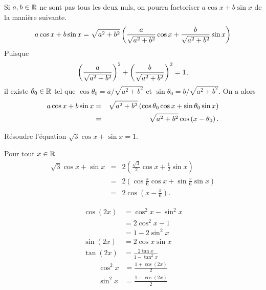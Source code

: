 \documentclass{magnoliaold}
\begin{document}
\begin{remarqueUnique}
\remarque Si $a,b\in\mathbb{R}$ ne sont pas tous les deux nuls, on pourra factoriser
  $a\cos x+b\sin x$ de la manière suivante.
  \[a\cos x+b\sin x=\sqrt{a^2+b^2}\left(\frac{a}{\sqrt{a^2+b^2}}\cos x+
                      \frac{b}{\sqrt{a^2+b^2}}\sin x\right)\]
  Puisque
  \[\left(\frac{a}{\sqrt{a^2+b^2}}\right)^2+\left(\frac{b}{\sqrt{a^2+b^2}}\right)^2=1,\]
  il existe $\theta_0\in\mathbb{R}$ tel que $\cos\theta_0=a/\sqrt{a^2+b^2}$ et
  $\sin\theta_0=b/\sqrt{a^2+b^2}$. On a alors
  \begin{eqnarray*}
  a\cos x+b\sin x &=& \sqrt{a^2+b^2}\left(\cos\theta_0\cos x+\sin\theta_0\sin x\right)\\
                  &=& \sqrt{a^2+b^2}\cos\left(x-\theta_0\right).
  \end{eqnarray*}
\end{remarqueUnique}

\begin{exoUnique}
\exo Résoudre l'équation $\sqrt{3}\cos x+\sin x=1$.
\begin{sol}
Pour tout $x\in\mathbb{R}$
\begin{eqnarray*}
\sqrt{3}\cos x+\sin x
&=& 2\left(\frac{\sqrt{3}}{2}\cos x+\frac{1}{2}\sin x \right)\\
&=& 2\left( \cos \frac{\pi}{6}\cos x+\sin \frac{\pi}{6}\sin x \right)\\
&=& 2\cos\left( x-\frac{\pi}{6}\right).
\end{eqnarray*}
\end{sol}
\end{exoUnique}

\begin{proposition}[utile=-3, nom={Angle double}]
\begin{align*}
\cos(2x)&=\cos^2 x-\sin^2 x\\
        &=2\cos^2 x-1\\
        &=1-2\sin^2 x\\
\sin(2x)&=2\cos x\sin x\\
\tan(2x)&=\frac{2\tan x}{1-\tan^2 x}
\end{align*}
\begin{align*}
\cos^2 x &=\frac{1+\cos(2x)}{2}\\
\sin^2 x &=\frac{1-\cos(2x)}{2}
\end{align*}
\end{proposition}
\end{document}
